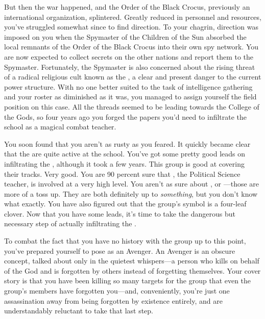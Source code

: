 \documentclass[char]{GL2020}
\begin{document}
But then the war happened, and the Order of the Black Crocus, previously an international organization, splintered. Greatly reduced in personnel and resources, you've struggled somewhat since to find direction. To your chagrin, direction was imposed on you when the Spymaster of the Children of the Sun absorbed the local remnants of the Order of the Black Crocus into their own spy network. You are now expected to collect secrets on the other nations and report them to the Spymaster. Fortunately, the Spymaster is also concerned about the rising threat of a radical religious cult known as the \pGoaties{}, a clear and present danger to the current power structure. With no one better suited to the task of intelligence gathering and your roster as diminished as it was, you managed to assign yourself the field position on this case. All the threads seemed to be leading towards the College of the Gods, so four years ago you forged the papers you'd need to infiltrate the school as a magical combat teacher.

You soon found that you aren't as rusty as you feared. It quickly became clear that the \pGoaties{} are quite active at the school. You've got some pretty good leads on infiltrating the \pGoaties{}, although it took a few years. This group is good at covering their tracks. Very good. You are 90 percent sure that \cChupInventor{\full}, the Political Science teacher, is involved at a very high level. You aren't as sure about \cChupSecond{\full}, or \cWildCard{\full}---those are more of a toss up. They are both definitely up to \emph{something}, but you don't know what exactly. You have also figured out that the group's symbol is a four-leaf clover. Now that you have some leads, it's time to take the dangerous but necessary step of actually infiltrating the \pGoaties{}.

To combat the fact that you have no history with the group up to this point, you've prepared yourself to pose as an Avenger. An Avenger is an obscure concept, talked about only in the quietest whispers---a person who kills on behalf of the God \cGenesis{} and is forgotten by others instead of forgetting themselves. Your cover story is that you have been killing so many targets for the group that even the group's members have forgotten you---and, conveniently, you're just one assassination away from being forgotten by existence entirely, and are understandably reluctant to take that last step.
\end{document}
